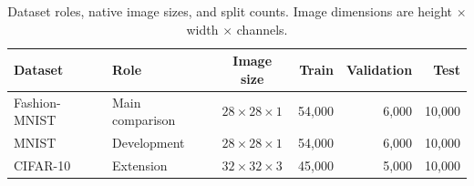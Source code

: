 \begin{table}[htbp]
\centering\small
\caption{Dataset roles, native image sizes, and split counts. Image dimensions
are height $\times$ width $\times$ channels.}
\label{tab:data-splits}
\begin{tabular}{llcrrr}
\toprule
Dataset & Role & Image size & Train & Validation & Test\\
\midrule
Fashion-MNIST & Main comparison & $28\times28\times1$ & 54,000 & 6,000 & 10,000\\
MNIST & Development & $28\times28\times1$ & 54,000 & 6,000 & 10,000\\
CIFAR-10 & Extension & $32\times32\times3$ & 45,000 & 5,000 & 10,000\\
\bottomrule
\end{tabular}
\end{table}

